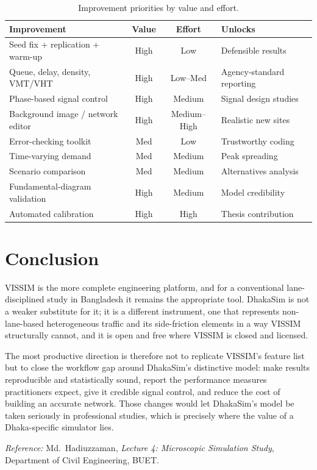 \documentclass[11pt,a4paper]{article}
\begin{document}
\begin{table}[h]
\centering
\small
\begin{tabular}{@{}p{}ccp{}@{}}
\toprule
\textbf{Improvement} & \textbf{Value} & \textbf{Effort} & \textbf{Unlocks} \\
\midrule
Seed fix + replication + warm-up & High & Low & Defensible results \\
Queue, delay, density, VMT/VHT   & High & Low--Med & Agency-standard reporting \\
Phase-based signal control        & High & Medium & Signal design studies \\
Background image / network editor & High & Medium--High & Realistic new sites \\
Error-checking toolkit            & Med  & Low & Trustworthy coding \\
Time-varying demand               & Med  & Medium & Peak spreading \\
Scenario comparison               & Med  & Medium & Alternatives analysis \\
Fundamental-diagram validation    & High & Medium & Model credibility \\
Automated calibration             & High & High & Thesis contribution \\
\bottomrule
\end{tabular}
\caption{Improvement priorities by value and effort.}
\end{table}

\section{Conclusion}
VISSIM is the more complete engineering platform, and for a conventional
lane-disciplined study in Bangladesh it remains the appropriate tool. DhakaSim is not
a weaker substitute for it; it is a different instrument, one that represents
non-lane-based heterogeneous traffic and its side-friction elements in a way VISSIM
structurally cannot, and it is open and free where VISSIM is closed and licensed.

The most productive direction is therefore not to replicate VISSIM's feature list but
to close the workflow gap around DhakaSim's distinctive model: make results
reproducible and statistically sound, report the performance measures practitioners
expect, give it credible signal control, and reduce the cost of building an accurate
network. Those changes would let DhakaSim's model be taken seriously in professional
studies, which is precisely where the value of a Dhaka-specific simulator lies.

\vspace{1em}
\noindent\textit{Reference:} Md.~Hadiuzzaman, \emph{Lecture 4: Microscopic Simulation
Study}, Department of Civil Engineering, BUET.
\end{document}
